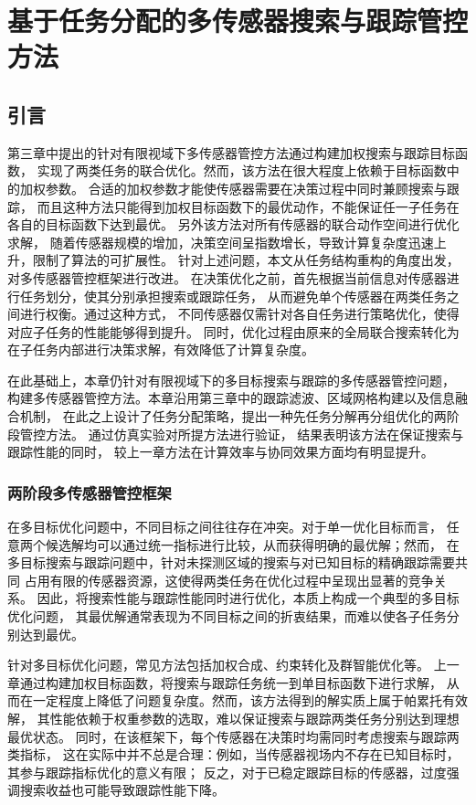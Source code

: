 \chapter{基于任务分配的多传感器搜索与跟踪管控方法}

\section{引言}
第三章中提出的针对有限视域下多传感器管控方法通过构建加权搜索与跟踪目标函数，
实现了两类任务的联合优化。然而，该方法在很大程度上依赖于目标函数中的加权参数。
合适的加权参数才能使传感器需要在决策过程中同时兼顾搜索与跟踪，
而且这种方法只能得到加权目标函数下的最优动作，不能保证任一子任务在各自的目标函数下达到最优。
另外该方法对所有传感器的联合动作空间进行优化求解，
随着传感器规模的增加，决策空间呈指数增长，导致计算复杂度迅速上升，限制了算法的可扩展性。
针对上述问题，本文从任务结构重构的角度出发，对多传感器管控框架进行改进。
在决策优化之前，首先根据当前信息对传感器进行任务划分，使其分别承担搜索或跟踪任务，
从而避免单个传感器在两类任务之间进行权衡。通过这种方式，
不同传感器仅需针对各自任务进行策略优化，使得对应子任务的性能能够得到提升。
同时，优化过程由原来的全局联合搜索转化为在子任务内部进行决策求解，有效降低了计算复杂度。

在此基础上，本章仍针对有限视域下的多目标搜索与跟踪的多传感器管控问题，
构建多传感器管控方法。本章沿用第三章中的跟踪滤波、区域网格构建以及信息融合机制，
在此之上设计了任务分配策略，提出一种先任务分解再分组优化的两阶段管控方法。
通过仿真实验对所提方法进行验证，
结果表明该方法在保证搜索与跟踪性能的同时，
较上一章方法在计算效率与协同效果方面均有明显提升。

\subsection{两阶段多传感器管控框架}
在多目标优化问题中，不同目标之间往往存在冲突。对于单一优化目标而言，
任意两个候选解均可以通过统一指标进行比较，从而获得明确的最优解；然而，
在多目标搜索与跟踪问题中，针对未探测区域的搜索与对已知目标的精确跟踪需要共同
占用有限的传感器资源，这使得两类任务在优化过程中呈现出显著的竞争关系。
因此，将搜索性能与跟踪性能同时进行优化，本质上构成一个典型的多目标优化问题，
其最优解通常表现为不同目标之间的折衷结果，而难以使各子任务分别达到最优。

针对多目标优化问题，常见方法包括加权合成、约束转化及群智能优化等。
上一章通过构建加权目标函数，将搜索与跟踪任务统一到单目标函数下进行求解，
从而在一定程度上降低了问题复杂度。然而，该方法得到的解实质上属于帕累托有效解，
其性能依赖于权重参数的选取，难以保证搜索与跟踪两类任务分别达到理想最优状态。
同时，在该框架下，每个传感器在决策时均需同时考虑搜索与跟踪两类指标，
这在实际中并不总是合理：例如，当传感器视场内不存在已知目标时，
其参与跟踪指标优化的意义有限；
反之，对于已稳定跟踪目标的传感器，过度强调搜索收益也可能导致跟踪性能下降。

